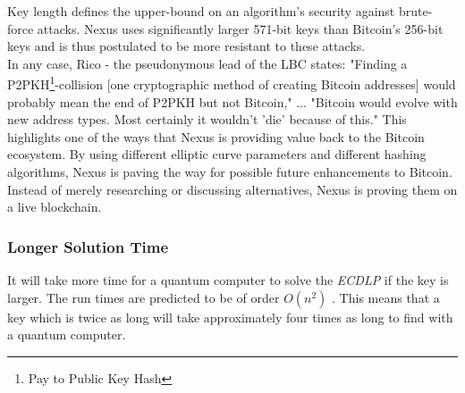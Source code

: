 \documentclass[11pt]{article}
\begin{document}
\noindent Key length defines the upper-bound on an algorithm's security \cite{wikikeysize} against brute-force attacks.
Nexus uses significantly larger 571-bit keys than Bitcoin's 256-bit keys and is thus postulated to be more resistant to these attacks.\\ 

\noindent In any case, Rico - the pseudonymous lead of the LBC states: "Finding a P2PKH\footnote{Pay to Public Key Hash\cite{p2pkh}}-collision [one cryptographic method of creating Bitcoin addresses] would probably mean the end of P2PKH but not Bitcoin," ... "Bitcoin would evolve with new address types. Most certainly it wouldn't 'die' because of this."\cite{largebitcoin}
This highlights one of the ways that Nexus is providing value back to the Bitcoin ecosystem.
By using different elliptic curve parameters and different hashing algorithms, Nexus is paving the way for possible future enhancements to Bitcoin.
Instead of merely researching or discussing alternatives, Nexus is proving them on a live blockchain.

\subsubsection*{Longer Solution Time}

It will take more time for a quantum computer to solve the \textit{ECDLP} if the key is larger.
The run times are predicted to be of order $O(n^2)$ \cite{prooszalka,kayezalka}.
This means that a key which is twice as long will take approximately four times as long to find with a quantum computer.
\end{document}
